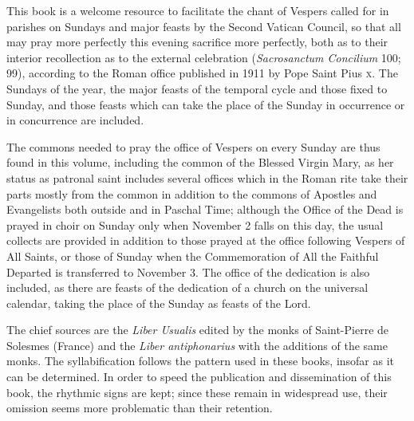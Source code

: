\begin{enpars}

This book is a welcome resource to facilitate the chant of Vespers called for in parishes on Sundays and major feasts by the Second Vatican Council, so that all may pray more perfectly this evening sacrifice more perfectly, both as to their interior recollection as to the external celebration (\textit{Sacrosanctum Concilium} 100; 99), according to the Roman office published in 1911 by Pope Saint Pius \textsc{x}. The Sundays of the year, the major feasts of the temporal cycle and those fixed to Sunday, and those feasts which can take the place of the Sunday in occurrence or in concurrence are included.



The commons needed to pray the office of Vespers on every Sunday are thus found in this volume, including the common of the Blessed Virgin Mary, as her status as patronal saint includes several offices which in the Roman rite take their parts mostly from the common in addition to the commons of Apostles and Evangelists both outside and in Paschal Time; although the Office of the Dead is prayed in choir on Sunday only when November 2 falls on this day, the usual collects are provided in addition to those prayed at the office following Vespers of All Saints, or those of Sunday when the Commemoration of All the Faithful Departed is transferred to November 3. The office of the dedication is also included, as there are feasts of the dedication of a church on the universal calendar, taking the place of the Sunday as feasts of the Lord.

The chief sources are the \textit{Liber Usualis} edited by the monks of Saint-Pierre de Solesmes (France) and the \textit{Liber antiphonarius} with the additions of the same monks. The syllabification follows the pattern used in these books, insofar as it can be determined. In order to speed the publication and dissemination of this book, the rhythmic signs are kept; since these remain in widespread use, their omission seems more problematic than their retention.


\end{enpars}
